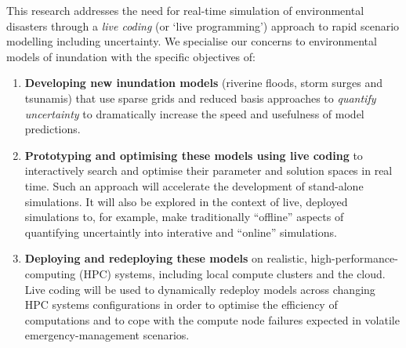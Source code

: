 This research addresses the need for real-time simulation of
environmental disasters through a {\em live coding} (or ‘live programming’)
approach to {rapid scenario modelling including uncertainty}. We specialise our concerns to
environmental models of inundation with the specific objectives of:
\begin{enumerate}

\item {\bf Developing new inundation models} (riverine floods,
  storm surges and tsunamis) that use sparse grids and reduced basis
  approaches to {\em quantify uncertainty} to dramatically increase the
  speed and usefulness of model predictions. 

\item {\bf Prototyping and optimising these models using live coding}
  to interactively search and optimise their parameter and solution spaces in real time. 
  Such an approach will accelerate the development of stand-alone simulations. It will also be explored in the 
  context of  live, deployed simulations to, for example, make traditionally ``offline'' aspects of 
   quantifying uncertaintly into  interative and ``online'' simulations.
  

\item {\bf Deploying and redeploying these models} on realistic,
  high-performance-computing (HPC) systems,
  including local compute clusters and the cloud. Live coding will be used
  to dynamically redeploy models across changing HPC systems configurations in order to optimise the efficiency of computations and 
  to cope with the compute node failures expected in volatile emergency-management scenarios.

\end{enumerate}

